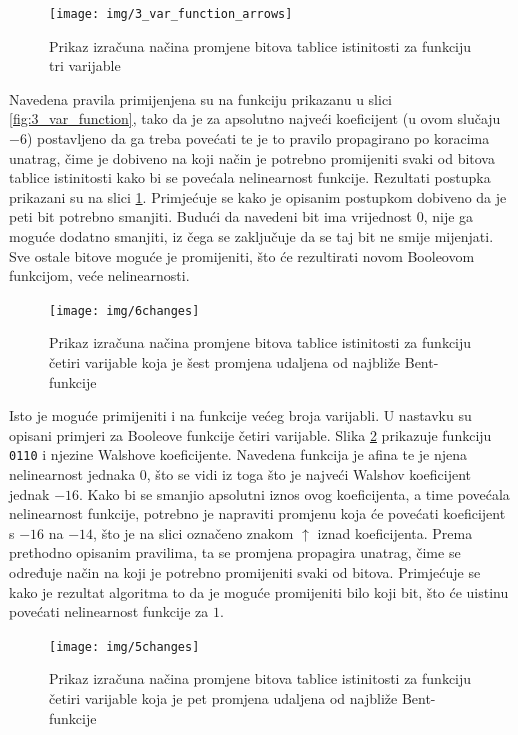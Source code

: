 \begin{figure}[ht!] 
    \centering
    \texttt{[image: img/3\_var\_function\_arrows]}
    \captionsetup{justification=centering}
    \caption{Prikaz izračuna načina promjene bitova tablice istinitosti za funkciju tri varijable}
    \label{fig:3_var_function_arrows}
\end{figure}
Navedena pravila primijenjena su na funkciju prikazanu u slici \ref{fig:3_var_function}, tako da je za apsolutno najveći koeficijent (u ovom slučaju $-6$) postavljeno da ga treba povećati te je to pravilo propagirano po koracima unatrag, čime je dobiveno na koji način je potrebno promijeniti svaki od bitova tablice istinitosti kako bi se povećala nelinearnost funkcije.
Rezultati postupka prikazani su na slici \ref{fig:3_var_function_arrows}. 
Primjećuje se kako je opisanim postupkom dobiveno da je peti bit potrebno smanjiti.
Budući da navedeni bit ima vrijednost $0$, nije ga moguće dodatno smanjiti, iz čega se zaključuje da se taj bit ne smije mijenjati.
Sve ostale bitove moguće je promijeniti, što će rezultirati novom Booleovom funkcijom, veće nelinearnosti.

\begin{figure}[ht!] 
    \centering
    \texttt{[image: img/6changes]}
    \captionsetup{justification=centering}
    \caption{Prikaz izračuna načina promjene bitova tablice istinitosti za funkciju četiri varijable koja je šest promjena udaljena od najbliže Bent-funkcije}
    \label{fig:6changes}
\end{figure}

Isto je moguće primijeniti i na funkcije većeg broja varijabli.
U nastavku su opisani primjeri za Booleove funkcije četiri varijable.
Slika \ref{fig:6changes} prikazuje funkciju \texttt{0110} i njezine Walshove koeficijente.
Navedena funkcija je afina te je njena nelinearnost jednaka $0$, što se vidi iz toga što je najveći Walshov koeficijent jednak $-16$.
Kako bi se smanjio apsolutni iznos ovog koeficijenta, a time povećala nelinearnost funkcije, potrebno je napraviti promjenu koja će povećati koeficijent s $-16$ na $-14$, što je na slici označeno znakom $\uparrow$ iznad koeficijenta. 
Prema prethodno opisanim pravilima, ta se promjena propagira unatrag, čime se određuje način na koji je potrebno promijeniti svaki od bitova.
Primjećuje se kako je rezultat algoritma to da je moguće promijeniti bilo koji bit, što će uistinu povećati nelinearnost funkcije za $1$.

\begin{figure}[ht!] 
    \centering
    \texttt{[image: img/5changes]}
    \captionsetup{justification=centering}
    \caption{Prikaz izračuna načina promjene bitova tablice istinitosti za funkciju četiri varijable koja je pet promjena udaljena od najbliže Bent-funkcije}
    \label{fig:5changes}
\end{figure}

